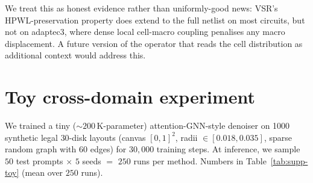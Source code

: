 \documentclass{article}
\begin{document}
\begin{table}[h]
\centering
\small

\caption{Full per-trial metrics across 24 (circuit, seed) trials,
$\lambda{=}2$ post-VSR.  $\Delta\text{oa}\,\%$ is the change in total
overlap area $\sum_{ij} A_{ij}/2$ (a continuous quantity sensitive to
near-misses, in addition to the integer violation count).
$\Delta h_\text{macro}\,\%$ is the macros-only HPWL (matches main-paper
Table~1).  $\Delta h_\text{full}\,\%$ is the full-design HPWL with cells
held at \texttt{.pl} positions.  Two findings: (i) the full-design
HPWL median ($+10.7\%$) is comparable to the macros-only median
($+8.7\%$), so the macro-axis HPWL trend generalises to the full design
on most circuits; (ii) on adaptec2 the full-design HPWL is $-31\%$
(macros-only is $+9\%$), suggesting that VSR's repair on adaptec2 moves
macros into positions that better match the cell distribution; (iii) on
adaptec3 the full-design HPWL inflates more sharply than macros-only
(consistent with adaptec3 having dense local cell-macro coupling that
VSR does not reason about).  VSR-intra-soft is HPWL-neutral on the full
design (median $-1.6\%$).  Raw rows:
\texttt{results/vsr\_extra/full\_metrics.json}.}
\label{tab:supp-full-hpwl}
\end{table}

We treat this as honest evidence rather than uniformly-good news: VSR's
HPWL-preservation property does extend to the full netlist on most
circuits, but not on adaptec3, where dense local cell-macro coupling
penalises any macro displacement.  A future version of the operator
that reads the cell distribution as additional context would address
this.

\section{Toy cross-domain experiment}
\label{sec:supp-toy2d}

We trained a tiny ($\sim 200$\,K-parameter) attention-GNN-style denoiser on
1000 synthetic legal $30$-disk layouts (canvas $[0,1]^2$, radii
$\in [0.018, 0.035]$, sparse random graph with $60$ edges) for $30{,}000$
training steps.  At inference, we sample $50$ test prompts $\times$ $5$
seeds $=$ $250$ runs per method.  Numbers in
Table~\ref{tab:supp-toy} (mean over $250$ runs).
\end{document}
